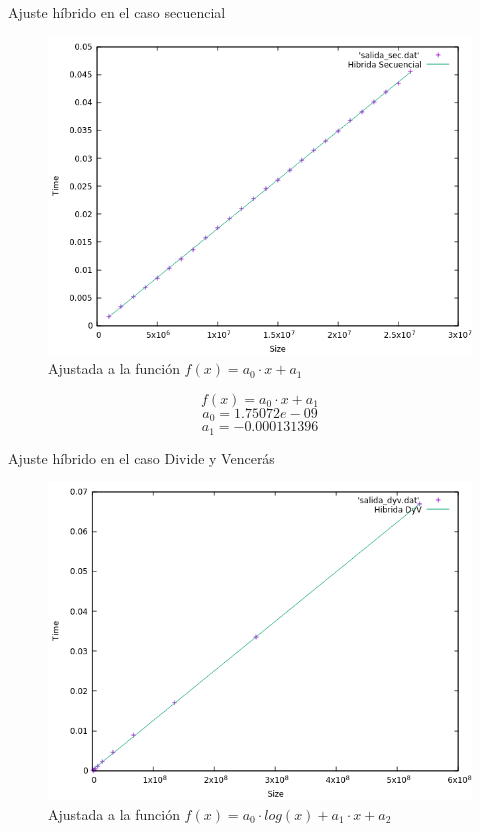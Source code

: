 \documentclass[12pt]{beamer}
\begin{document}
\begin{frame}{Ajuste híbrido en el caso secuencial}

\begin{figure}[H] 
\centering
\includegraphics[angle=0,scale=0.5]{img/AjusteHibridoSec.png} 
\caption{Ajustada a la función $f(x)=a_0 \cdot x+a_1$} 
\end{figure}

\end{frame}

\begin{frame}
\[
f(x)=a_0 \cdot x+a_1 
\]
\[
a_0=1.75072e-09
\]
\[
a_1=-0.000131396
\]
\end{frame}

\begin{frame}{Ajuste híbrido en el caso Divide y Vencerás}

\begin{figure}[H] 
\centering
\includegraphics[angle=0,scale=0.5]{img/AjusteHibridoDyV.png} 
\caption{Ajustada a la función $f(x)=a_0 \cdot log(x)+a_1 \cdot x+a_2$} 
\end{figure}

\end{frame}
\end{document}
